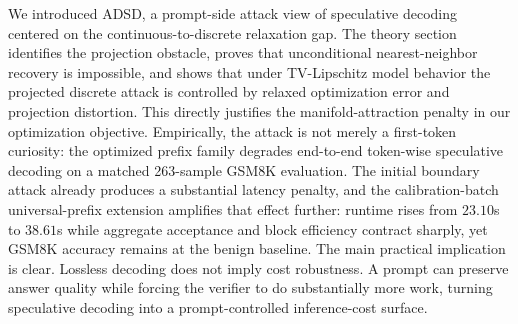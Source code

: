 \documentclass{article}
\begin{document}
We introduced ADSD, a prompt-side attack view of speculative decoding centered
on the continuous-to-discrete relaxation gap. The theory section identifies the
projection obstacle, proves that unconditional nearest-neighbor recovery is
impossible, and shows that under TV-Lipschitz model behavior the projected
discrete attack is controlled by relaxed optimization error and projection
distortion. This directly justifies the manifold-attraction penalty in our
optimization objective. Empirically, the attack is not merely a first-token
curiosity: the optimized prefix family degrades end-to-end token-wise
speculative decoding on a matched 263-sample GSM8K evaluation. The initial
boundary attack already produces a substantial latency penalty, and the
calibration-batch universal-prefix extension amplifies that effect further:
runtime rises from $23.10$s to $38.61$s while aggregate acceptance and block
efficiency contract sharply, yet GSM8K accuracy remains at the benign baseline.
The main practical implication is clear. Lossless decoding does not imply cost
robustness. A prompt can preserve answer quality while forcing the verifier to
do substantially more work, turning speculative decoding into a
prompt-controlled inference-cost surface.





\end{document}
